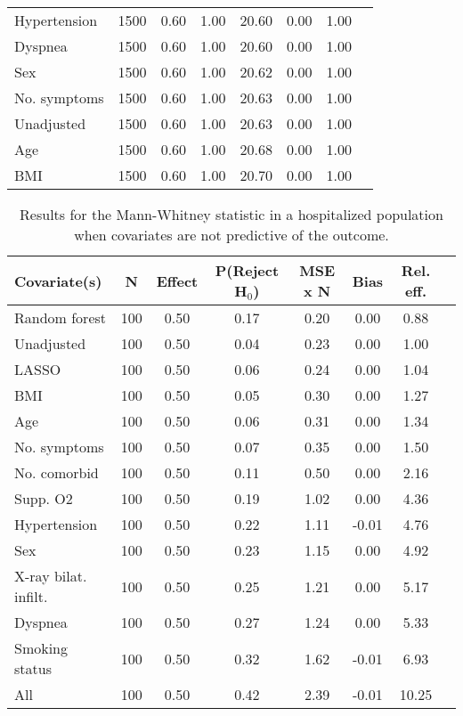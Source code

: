 \documentclass{article}
\begin{document}
{\begin{longtable}{lccccccc}
Hypertension & 1500 & 0.60 & 1.00 &  20.60 &  0.00 & 1.00 \\ 
Dyspnea & 1500 & 0.60 & 1.00 &  20.60 &  0.00 & 1.00 \\ 
Sex & 1500 & 0.60 & 1.00 &  20.62 &  0.00 & 1.00 \\ 
No. symptoms & 1500 & 0.60 & 1.00 &  20.63 &  0.00 & 1.00 \\ 
Unadjusted & 1500 & 0.60 & 1.00 &  20.63 &  0.00 & 1.00 \\ 
Age & 1500 & 0.60 & 1.00 &  20.68 &  0.00 & 1.00 \\ 
BMI & 1500 & 0.60 & 1.00 &  20.70 &  0.00 & 1.00 \\
\bottomrule
\hline
\end{longtable}
}

\clearpage

{\tabcolsep=6pt  %
\begin{longtable}{lccccccc}
\caption{Results for the Mann-Whitney statistic in a hospitalized population when covariates are not predictive of the outcome.} \\
Covariate(s) & N & Effect & P(Reject H$_0$) & MSE x N & Bias & Rel. eff.\\ \midrule
Random forest & 100 & 0.50 & 0.17 & 0.20 &  0.00 &  0.88 \\ 
Unadjusted & 100 & 0.50 & 0.04 & 0.23 &  0.00 &  1.00 \\ 
LASSO & 100 & 0.50 & 0.06 & 0.24 &  0.00 &  1.04 \\ 
BMI & 100 & 0.50 & 0.05 & 0.30 &  0.00 &  1.27 \\ 
Age & 100 & 0.50 & 0.06 & 0.31 &  0.00 &  1.34 \\ 
No. symptoms & 100 & 0.50 & 0.07 & 0.35 &  0.00 &  1.50 \\ 
No. comorbid & 100 & 0.50 & 0.11 & 0.50 &  0.00 &  2.16 \\ 
Supp. O2 & 100 & 0.50 & 0.19 & 1.02 &  0.00 &  4.36 \\ 
Hypertension & 100 & 0.50 & 0.22 & 1.11 & -0.01 &  4.76 \\ 
Sex & 100 & 0.50 & 0.23 & 1.15 &  0.00 &  4.92 \\ 
X-ray bilat. infilt. & 100 & 0.50 & 0.25 & 1.21 &  0.00 &  5.17 \\ 
Dyspnea & 100 & 0.50 & 0.27 & 1.24 &  0.00 &  5.33 \\ 
Smoking status & 100 & 0.50 & 0.32 & 1.62 & -0.01 &  6.93 \\ 
All & 100 & 0.50 & 0.42 & 2.39 & -0.01 & 10.25 \\ \midrule() 

\end{longtable}}
\end{document}
